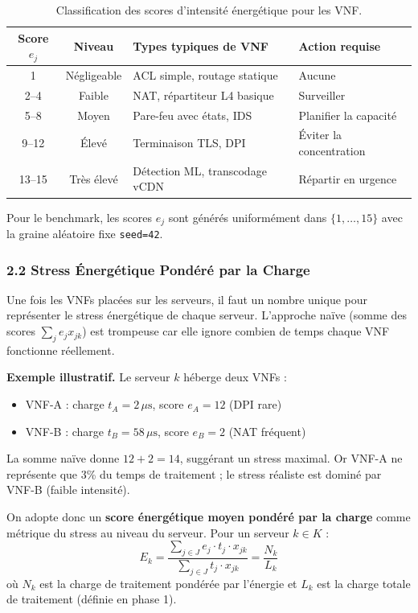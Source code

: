 \documentclass{article}
\begin{document}
\begin{table}[h!]
\centering
\small
\begin{tabular}{c c l l}
\toprule
\textbf{Score $e_j$} & \textbf{Niveau} & \textbf{Types typiques de VNF} & \textbf{Action requise} \\
\midrule
1 & Négligeable & ACL simple, routage statique & Aucune \\
2--4 & Faible & NAT, répartiteur L4 basique & Surveiller \\
5--8 & Moyen & Pare-feu avec états, IDS & Planifier la capacité \\
9--12 & Élevé & Terminaison TLS, DPI & Éviter la concentration \\
13--15 & Très élevé & Détection ML, transcodage vCDN & Répartir en urgence \\
\bottomrule
\end{tabular}
\caption{Classification des scores d'intensité énergétique pour les VNF.}
\end{table}

Pour le benchmark, les scores $e_j$ sont générés uniformément dans $\{1, \ldots, 15\}$ avec la graine aléatoire fixe \texttt{seed=42}.

\subsubsection{2.2 Stress Énergétique Pondéré par la Charge}

Une fois les VNFs placées sur les serveurs, il faut un nombre unique pour représenter le stress énergétique de chaque serveur. L'approche naïve (somme des scores $\sum_j e_j x_{jk}$) est trompeuse car elle ignore combien de temps chaque VNF fonctionne réellement.

\textbf{Exemple illustratif.} Le serveur $k$ héberge deux VNFs :
\begin{itemize}
    \item VNF-A : charge $t_A = 2\,\mu\text{s}$, score $e_A = 12$ (DPI rare)
    \item VNF-B : charge $t_B = 58\,\mu\text{s}$, score $e_B = 2$ (NAT fréquent)
\end{itemize}
La somme naïve donne $12 + 2 = 14$, suggérant un stress maximal. Or VNF-A ne représente que 3\% du temps de traitement ; le stress réaliste est dominé par VNF-B (faible intensité).

On adopte donc un \textbf{score énergétique moyen pondéré par la charge} comme métrique du stress au niveau du serveur. Pour un serveur $k \in K$ :
\[
E_k = \frac{\sum_{j \in J} e_j \cdot t_j \cdot x_{jk}}{\sum_{j \in J} t_j \cdot x_{jk}} = \frac{N_k}{L_k}
\]
où $N_k$ est la charge de traitement pondérée par l'énergie et $L_k$ est la charge totale de traitement (définie en phase 1).
\end{document}
